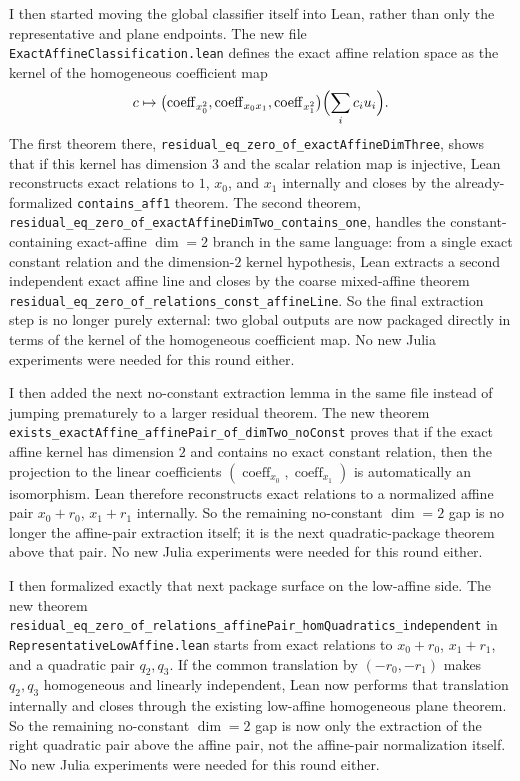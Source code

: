 \documentclass[11pt]{article}
\begin{document}
I then started moving the global classifier itself into Lean, rather than only
the representative and plane endpoints. The new file
\texttt{ExactAffineClassification.lean} defines the exact affine relation space
as the kernel of the homogeneous coefficient map
\[
  c \mapsto
  \bigl(\operatorname{coeff}_{x_0^2},
    \operatorname{coeff}_{x_0x_1},
    \operatorname{coeff}_{x_1^2}\bigr)\Bigl(\sum_i c_i u_i\Bigr).
\]
The first theorem there,
\texttt{residual\_eq\_zero\_of\_exactAffineDimThree}, shows that if this kernel
has dimension \(3\) and the scalar relation map is injective, Lean reconstructs
exact relations to \(1\), \(x_0\), and \(x_1\) internally and closes by the
already-formalized \texttt{contains\_aff1} theorem. The second theorem,
\texttt{residual\_eq\_zero\_of\_exactAffineDimTwo\_contains\_one}, handles the
constant-containing exact-affine \(\dim=2\) branch in the same language: from a
single exact constant relation and the dimension-\(2\) kernel hypothesis, Lean
extracts a second independent exact affine line and closes by the coarse
mixed-affine theorem \texttt{residual\_eq\_zero\_of\_relations\_const\_affineLine}.
So the final extraction step is no longer purely external: two global outputs
are now packaged directly in terms of the kernel of the homogeneous coefficient
map. No new Julia experiments were needed for this round either.

I then added the next no-constant extraction lemma in the same file instead of
jumping prematurely to a larger residual theorem. The new theorem
\texttt{exists\_exactAffine\_affinePair\_of\_dimTwo\_noConst} proves that if the
exact affine kernel has dimension \(2\) and contains no exact constant
relation, then the projection to the linear coefficients
\((\operatorname{coeff}_{x_0}, \operatorname{coeff}_{x_1})\) is automatically an
isomorphism. Lean therefore reconstructs exact relations to a normalized affine
pair \(x_0 + r_0\), \(x_1 + r_1\) internally. So the remaining no-constant
\(\dim=2\) gap is no longer the affine-pair extraction itself; it is the next
quadratic-package theorem above that pair. No new Julia experiments were needed
for this round either.

I then formalized exactly that next package surface on the low-affine side. The
new theorem
\texttt{residual\_eq\_zero\_of\_relations\_affinePair\_homQuadratics\_independent}
in \texttt{RepresentativeLowAffine.lean} starts from exact relations to
\(x_0 + r_0\), \(x_1 + r_1\), and a quadratic pair \(q_2,q_3\). If the common
translation by \((-r_0,-r_1)\) makes \(q_2,q_3\) homogeneous and linearly
independent, Lean now performs that translation internally and closes through
the existing low-affine homogeneous plane theorem. So the remaining
no-constant \(\dim=2\) gap is now only the extraction of the right quadratic
pair above the affine pair, not the affine-pair normalization itself. No new
Julia experiments were needed for this round either.
\end{document}
